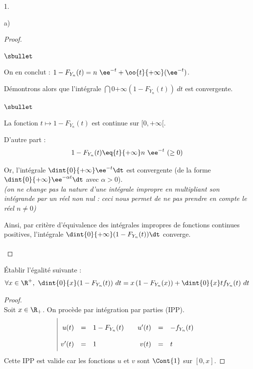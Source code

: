 \documentclass[11pt]{article}%
\begin{document}
\begin{noliste}{1.}
\begin{noliste}{a)}
\begin{proof}
\begin{noliste}{$\sbullet$}


      \item On en conclut : $1-F_{Y_n}(t) = n \ \ee^{-t} +
        \oo{t}{+\infty}(\ee^{-t})$. %
      \end{noliste}

      \noindent Démontrons alors que l'intégrale $\dint{0}{+ \infty}
      \left(1-F_{Y_{n}}(t) \right) \ dt$ est convergente.
      \begin{noliste}{$\sbullet$}       
      \item La fonction $t\mapsto 1-F_{Y_n}(t)$ est continue sur
        $[0,+\infty[$.
      \item D'autre part :
        \[
        1-F_{Y_n}(t) \eq{t}{+\infty} n\ \ee^{-t} \ (\geq 0)
        \]
      \item Or, l'intégrale $\dint{0}{+\infty} \ee^{-t} \dt$ est
        convergente (de la forme $\dint{0}{+\infty} \ee^{- \alpha t}
        \dt$ avec $\alpha > 0$).\\
        {\it (on ne change pas la nature d'une intégrale impropre en
          multipliant son intégrande par un réel non nul : ceci nous
          permet de ne pas prendre en compte le réel $n \neq 0$)}
      \end{noliste}
      Ainsi, par critère d'équivalence des intégrales impropres de
      fonctions continues positives, l'intégrale $\dint{0}{+\infty}
      (1-F_{Y_n}(t))\dt$ converge.%
      ~\\[-.8cm]
      ~\\[-1.4cm]
    \end{proof}
      
  \item Établir l'égalité suivante :
    \[
    \forall x \in \R^+, \ \dint{0}{x} (1-F_{Y_{n}}(t)) \ dt =
    x\left(1-F_{Y_{n}}(x)\right) + \dint{0}{x} t f_{Y_{n}}(t) \ dt
    \]
    
    \begin{proof}~\\
      Soit $x\in\R_+$.
      On procède par intégration par parties (IPP).
        \[
        \renewcommand{\arraystretch}{2}
        \begin{array}{|rcl@{\qquad}rcl}
          u(t) & = & 1-F_{Y_n}(t) & u'(t) & = & -f_{Y_n}(t) \\
          v'(t) & = & 1 & v(t) & = & t
        \end{array}
        \]
      Cette IPP est valide car les fonctions $u$ et $v$ sont 
      $\Cont{1}$ sur $[0, x]$. 



\end{proof}
\end{noliste}
\end{noliste}
\end{document}
